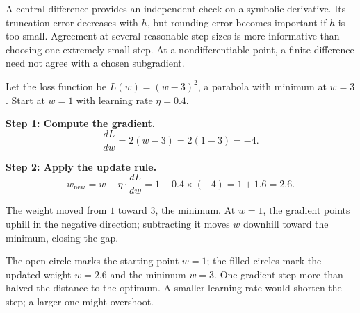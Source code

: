 A central difference provides an independent check on a symbolic derivative. Its truncation error decreases with $h$, but rounding error becomes important if $h$ is too small. Agreement at several reasonable step sizes is more informative than choosing one extremely small step. At a nondifferentiable point, a finite difference need not agree with a chosen subgradient.

\begin{example}
Let the loss function be \(L(w) = (w - 3)^2\), a parabola with minimum at \(w = 3\). Start at \(w = 1\) with learning rate \(\eta = 0.4\).

\textbf{Step 1: Compute the gradient.}
\[
\frac{dL}{dw} = 2(w - 3) = 2(1 - 3) = -4.
\]

\textbf{Step 2: Apply the update rule.}
\[
w_{\text{new}} = w - \eta \cdot \frac{dL}{dw} = 1 - 0.4 \times (-4) = 1 + 1.6 = 2.6.
\]

The weight moved from \(1\) toward \(3\), the minimum. At \(w=1\), the gradient points uphill in the negative direction; subtracting it moves \(w\) downhill toward the minimum, closing the gap.

\begin{center}
\end{center}

The open circle marks the starting point \(w=1\); the filled circles mark the updated weight \(w=2.6\) and the minimum \(w=3\). One gradient step more than halved the distance to the optimum. A smaller learning rate would shorten the step; a larger one might overshoot.
\end{example}

